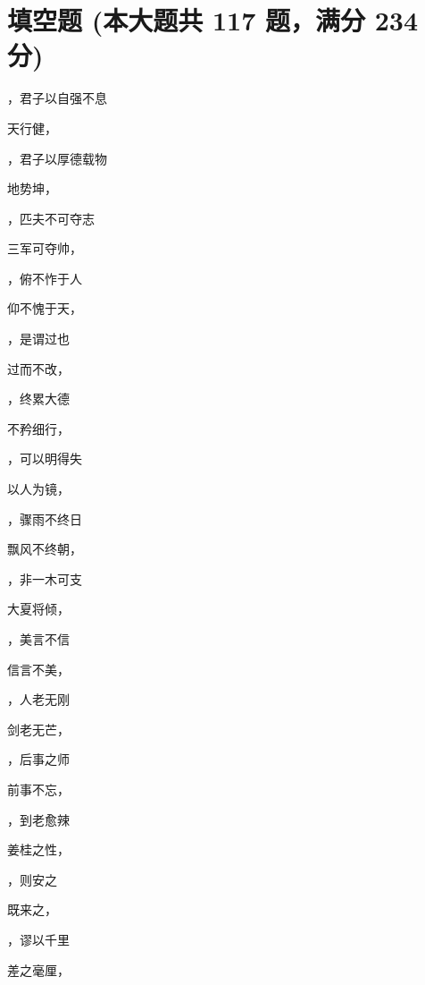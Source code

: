 \documentclass[12pt, a4paper, addpoints, answers]{exam}
\begin{document}
\hspace{5cm}

\section{\normalsize{填空题 (本大题共 117 题，满分 234 分)}}
\hspace{1.5cm}
\begin{multicols}{2}
\begin{questions}
\question[2] \fillin，君子以自强不息

\question[2] 天行健，\fillin

\question[2] \fillin，君子以厚德载物

\question[2] 地势坤，\fillin

\question[2] \fillin，匹夫不可夺志

\question[2] 三军可夺帅，\fillin

\question[2] \fillin，俯不怍于人

\question[2] 仰不愧于天，\fillin

\question[2] \fillin，是谓过也

\question[2] 过而不改，\fillin

\question[2] \fillin，终累大德

\question[2] 不矜细行，\fillin

\question[2] \fillin，可以明得失

\question[2] 以人为镜，\fillin

\question[2] \fillin，骤雨不终日

\question[2] 飘风不终朝，\fillin

\question[2] \fillin，非一木可支

\question[2] 大夏将倾，\fillin

\question[2] \fillin，美言不信

\question[2] 信言不美，\fillin

\question[2] \fillin，人老无刚

\question[2] 剑老无芒，\fillin

\question[2] \fillin，后事之师

\question[2] 前事不忘，\fillin

\question[2] \fillin，到老愈辣

\question[2] 姜桂之性，\fillin

\question[2] \fillin，则安之

\question[2] 既来之，\fillin

\question[2] \fillin，谬以千里

\question[2] 差之毫厘，\fillin


\end{questions}
\end{multicols}
\end{document}
